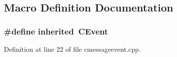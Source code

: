 \subsection{Macro Definition Documentation}
\subsubsection[{inherited}]{\setlength{\rightskip}{0pt plus 5cm}\#define inherited~C\+Event}\label{cmessageevent_8cpp_a3920e3b7cb0909b941b2409493acf8f1}


Definition at line 22 of file cmessageevent.\+cpp.

